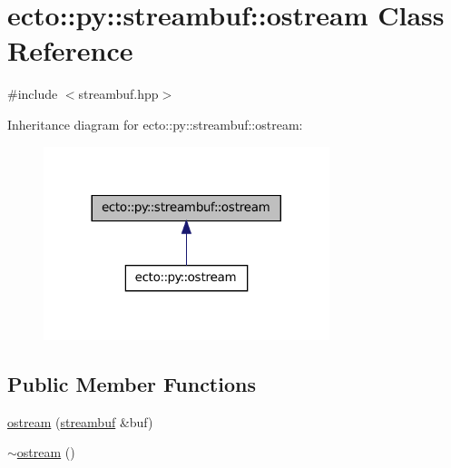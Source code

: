 \hypertarget{classecto_1_1py_1_1streambuf_1_1ostream}{\section{ecto\-:\-:py\-:\-:streambuf\-:\-:ostream \-Class \-Reference}
\label{classecto_1_1py_1_1streambuf_1_1ostream}
}


{\ttfamily \#include $<$streambuf.\-hpp$>$}



\-Inheritance diagram for ecto\-:\-:py\-:\-:streambuf\-:\-:ostream\-:\nopagebreak
\begin{figure}[H]
\begin{center}
\leavevmode
\includegraphics[width=236pt]{classecto_1_1py_1_1streambuf_1_1ostream__inherit__graph}
\end{center}
\end{figure}
\subsection*{\-Public \-Member \-Functions}
\begin{DoxyCompactItemize}
\item 
\hyperlink{classecto_1_1py_1_1streambuf_1_1ostream_ab62cdec76b066fa4492b032dd1533bc5}{ostream} (\hyperlink{classecto_1_1py_1_1streambuf}{streambuf} \&buf)
\item 
\hyperlink{classecto_1_1py_1_1streambuf_1_1ostream_abeaab4a21b07a3bbf944d4ce8693a7b5}{$\sim$ostream} ()
\end{DoxyCompactItemize}


